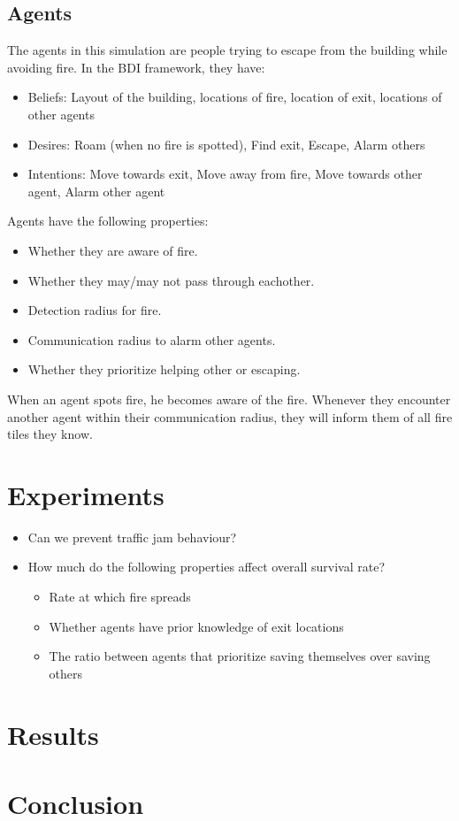 \documentclass[a4paper]{article}
\begin{document}
\subsection{Agents}
The agents in this simulation are people trying to escape from the building while avoiding fire. In the BDI framework, they have:
\begin{itemize}
\item Beliefs: Layout of the building, locations of fire, location of exit, locations of other agents
\item Desires: Roam (when no fire is spotted), Find exit, Escape, Alarm others
\item Intentions: Move towards exit, Move away from fire, Move towards other agent, Alarm other agent
\end{itemize}
Agents have the following properties:
\begin{itemize}
\item Whether they are aware of fire.
\item Whether they may/may not pass through eachother.
\item Detection radius for fire.
\item Communication radius to alarm other agents.
\item Whether they prioritize helping other or escaping.
\end{itemize}

When an agent spots fire, he becomes aware of the fire. Whenever they encounter another agent within their communication radius, they will inform them of all fire tiles they know.

\FloatBarrier
\section{Experiments}
\begin{itemize}
\item Can we prevent traffic jam behaviour?
\item How much do the following properties affect overall survival rate?
\begin{itemize}
\item Rate at which fire spreads
\item Whether agents have prior knowledge of exit locations
\item The ratio between agents that prioritize saving themselves over saving others
\end{itemize}
\end{itemize}

\section{Results}

\section{Conclusion}
\end{document}
